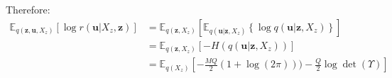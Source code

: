 \documentclass[12pt]{article}
\newcommand{\ub}{\mathbf{u}}
\newcommand{\zb}{\mathbf{z}}
\newcommand{\Ex}{\mathbb{E}}
\begin{document}
%
Therefore:
%
\begin{align}
\Ex_{q(\zb,\ub,X_z)}\left[\log r(\ub|X_z,\zb)\right] &= \Ex_{q(\zb,X_z)}\left[ \Ex_{q(\ub|\zb,X_z)} \left\{\log q(\ub|\zb,X_z) \right\} \right] \\
&= \Ex_{q(\zb,X_z)}\left[-H(q(\ub|\zb,X_z)) \right] \\
&= \Ex_{q(X_z)}\left[-\frac{MQ}{2}(1+\log(2\pi))) -\frac{Q}{2}\log\det(\Upsilon) \right]
\end{align}
%
\end{document}
